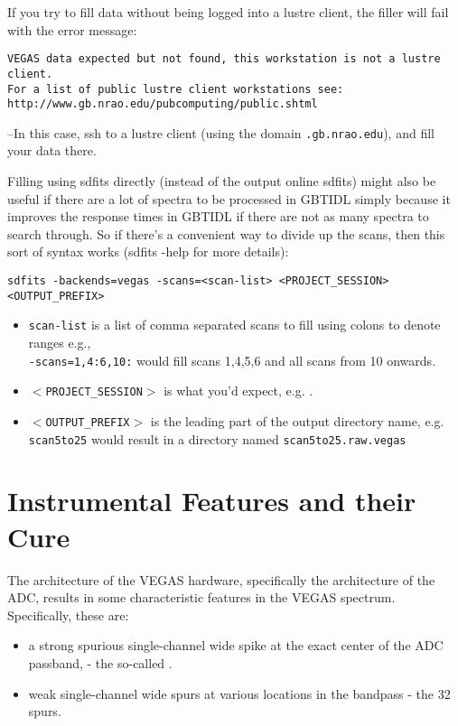 \noindent If you try to fill data without being logged into a lustre client,
the filler will fail with the error message:

\begin{verbatim}
VEGAS data expected but not found, this workstation is not a lustre client.
For a list of public lustre client workstations see: 
http://www.gb.nrao.edu/pubcomputing/public.shtml
\end{verbatim}

\noindent --In this case, ssh to a lustre client (using the domain {\tt .gb.nrao.edu}),
and fill your data there.

Filling using sdfits directly (instead of the output online sdfits) 
might also be useful if there are a lot of spectra to be processed in \gls{GBTIDL} 
simply because it improves the response times in \gls{GBTIDL} if there are not 
as many spectra to search through.  So if there's a convenient way to 
divide up the scans, then this sort of syntax works (sdfits -help for more details):

\begin{verbatim}
sdfits -backends=vegas -scans=<scan-list> <PROJECT_SESSION> <OUTPUT_PREFIX>
\end{verbatim}

\begin{itemize}[leftmargin=*,itemsep=0pt]
\item {\tt scan-list} is a list of comma separated scans to fill using colons to
denote ranges e.g.,\\ {\tt -scans=1,4:6,10:} would fill scans 1,4,5,6 and all
scans from 10 onwards.
\item {\tt $<$PROJECT\_SESSION$>$} is what you'd expect, e.g. .
\item {\tt $<$OUTPUT\_PREFIX$>$} is the leading part of the output directory name,
e.g. {\tt scan5to25} would result in a directory named {\tt scan5to25.raw.vegas}
\end{itemize}

\section{Instrumental Features and their Cure}\label{sec:vegas_features}

The architecture of the VEGAS hardware, specifically the architecture
of the \gls{ADC}, results in some characteristic features in the VEGAS spectrum. 
Specifically, these are:

\begin{itemize}[itemsep=0pt]
\item a strong spurious single-channel wide spike at the exact center of 
the \gls{ADC} passband, - the so-called .
\item weak single-channel wide spurs at various locations in the 
bandpass - the 32 spurs.
\end{itemize}

